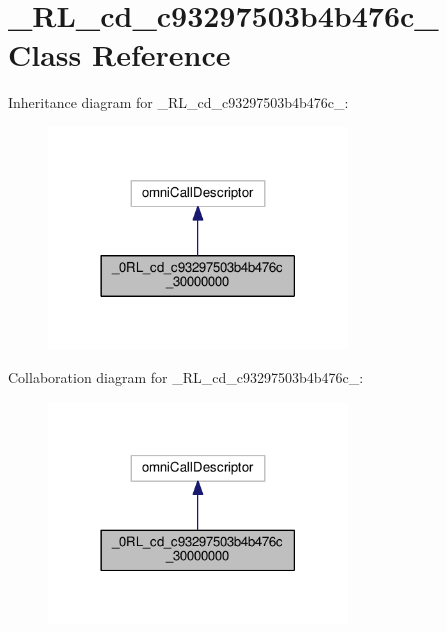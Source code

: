 \hypertarget{class__0_r_l__cd__c93297503b4b476c__30000000}{}\section{\+\_\+R\+L\+\_\+cd\+\_\+c93297503b4b476c\+\_ Class Reference}
\label{class__0_r_l__cd__c93297503b4b476c__30000000}


Inheritance diagram for \+\_\+R\+L\+\_\+cd\+\_\+c93297503b4b476c\+\_\+:
\nopagebreak
\begin{figure}[H]
\begin{center}
\leavevmode
\includegraphics[width=225pt]{class__0_r_l__cd__c93297503b4b476c__30000000__inherit__graph}
\end{center}
\end{figure}


Collaboration diagram for \+\_\+R\+L\+\_\+cd\+\_\+c93297503b4b476c\+\_\+:
\nopagebreak
\begin{figure}[H]
\begin{center}
\leavevmode
\includegraphics[width=225pt]{class__0_r_l__cd__c93297503b4b476c__30000000__coll__graph}
\end{center}
\end{figure}
